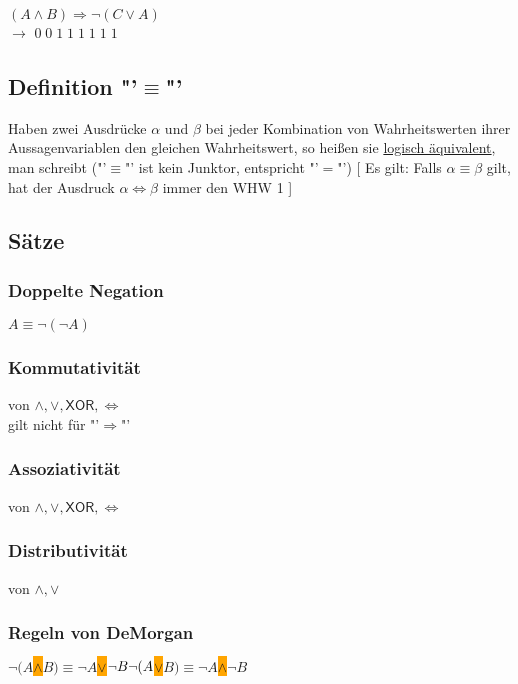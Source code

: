 \documentclass[10pt,a4paper,titlepage,fleqn]{article}
\newcommand{\XOR}{\mathsf{XOR}}
\newcommand*{\TakeFourierOrnament}[1]{{%
\fontencoding{U}\fontfamily{futs}\selectfont\char#1}}
\newcommand*{\danger}{\TakeFourierOrnament{66}}
\begin{document}
\subsubsection{}
	$(A\wedge B)\Rightarrow \neg (C\vee A)$\\
	\quad $\rightarrow$ \; $0\;0\;1\;1\;1\;1\;1\;1$
\subsection{Definition "'$\equiv$"'}
	 Haben zwei Ausdrücke $\alpha$ und $\beta$ bei jeder 
	Kombination von Wahrheitswerten ihrer Aussagenvariablen den gleichen Wahrheitswert,
	so heißen sie \underline{\textsf{logisch äquivalent}}, man schreibt 
	\framebox[1.3\width]{$\alpha \equiv\beta$} ("'$\equiv$"' ist kein Junktor, 
	entspricht "'$=$"') [ Es gilt: Falls $\alpha \equiv\beta$ gilt, hat der Ausdruck 
	$\alpha \Leftrightarrow\beta$ immer den WHW 1 ]
\subsection{Sätze}
\subsubsection{Doppelte Negation}
	$A\equiv \neg(\neg A)$
\subsubsection{Kommutativität}
	von $\wedge,\vee,\XOR, \Leftrightarrow$\\
	\hphantom{b) }\danger\; gilt nicht für "'$\Rightarrow$"'
\subsubsection{Assoziativität}
	von $\wedge,\vee,\XOR, \Leftrightarrow$
\subsubsection{Distributivität}
	von $\wedge,\vee$
\subsubsection{Regeln von DeMorgan}\hfill\break
	$\neg (A $\colorbox{orange}{$\wedge$}$ B) \equiv \neg A 
	$\colorbox{orange}{$\vee$}$\neg B\\
	\neg (A $\colorbox{orange}{$\vee$}$ B) \equiv \neg A 
	$\colorbox{orange}{$\wedge$}$\neg B$
\end{document}
